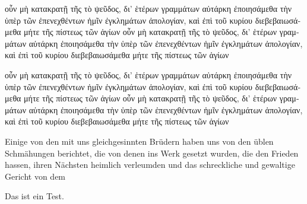 \documentclass{memoir}
\begin{document}
\begin{greek}
\beginnumbering
\pstart
οὖν μὴ κατακρατῇ τῆς 
  τὸ ψεῦδος, δι’ ἑτέρων γραμμάτων αὐτάρκη ἐποιησάμεθα τὴν ὑπὲρ τῶν
  ἐπενεχθέντων ἡμῖν ἐγκλημάτων ἀπολογίαν, καὶ ἐπὶ τοῦ κυρίου
  διεβεβαιωσάμεθα μήτε τῆς πίστεως τῶν ἁγίων
οὖν μὴ κατακρατῇ τῆς 
  τὸ ψεῦδος, δι’ ἑτέρων γραμμάτων αὐτάρκη ἐποιησάμεθα τὴν ὑπὲρ τῶν
  ἐπενεχθέντων ἡμῖν ἐγκλημάτων ἀπολογίαν, καὶ ἐπὶ τοῦ κυρίου
  διεβεβαιωσάμεθα μήτε τῆς πίστεως τῶν ἁγίων
  \pend
\endnumbering
\end{greek}
\begin{pairs}
\begin{Leftside}
\begin{greek}
\beginnumbering
\pstart
οὖν μὴ κατακρατῇ τῆς 
  τὸ ψεῦδος, δι’ ἑτέρων γραμμάτων αὐτάρκη ἐποιησάμεθα τὴν ὑπὲρ τῶν
  ἐπενεχθέντων ἡμῖν ἐγκλημάτων ἀπολογίαν, καὶ ἐπὶ τοῦ κυρίου
  διεβεβαιωσάμεθα μήτε τῆς πίστεως τῶν ἁγίων
οὖν μὴ κατακρατῇ τῆς 
  τὸ ψεῦδος, δι’ ἑτέρων γραμμάτων αὐτάρκη ἐποιησάμεθα τὴν ὑπὲρ τῶν
  ἐπενεχθέντων ἡμῖν ἐγκλημάτων ἀπολογίαν, καὶ ἐπὶ τοῦ κυρίου
  διεβεβαιωσάμεθα μήτε τῆς πίστεως τῶν ἁγίων
  \pend
\endnumbering
\end{greek}
\end{Leftside}
\begin{Rightside}
    \beginnumbering
    \pstart
    Einige von den mit uns gleichgesinnten Brüdern haben uns von den üblen Schmähungen berichtet, die von denen ins Werk gesetzt wurden, die den Frieden hassen, ihren Nächsten heimlich verleumden und das schreckliche und gewaltige Gericht von dem
    \pend
    \endnumbering
\end{Rightside}
\end{pairs}
\Columns
Das ist ein Test.
\end{document}
